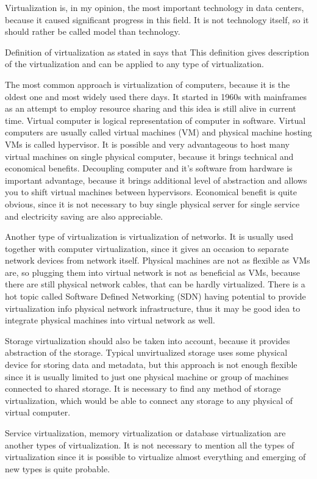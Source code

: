 
Virtualization is, in my opinion, the most important technology in data centers, because it caused significant progress in this field. It is not technology itself, so it should rather be called model than technology.

Definition of virtualization as stated in \cite{virtualization-in-education} says that  This definition gives description of the virtualization and can be applied to any type of virtualization.

The most common approach is virtualization of computers, because it is the oldest one and most widely used there days. It started in 1960s with mainframes as an attempt to employ resource sharing and this idea is still alive in current time. Virtual computer is logical representation of computer in software. \cite{virtualization-in-education} Virtual computers are usually called virtual machines (\Ac{VM}) and physical machine hosting \Ac{VM}s is called hypervisor. It is possible and very advantageous to host many virtual machines on single physical computer, because it brings technical and economical benefits. Decoupling computer and it's software from hardware is important advantage, because it brings additional level of abstraction and allows you to shift virtual machines between hypervisors. Economical benefit is quite obvious, since it is not necessary to buy single physical server for single service and electricity saving are also appreciable.

Another type of virtualization is virtualization of networks. It is usually used together with computer virtualization, since it gives an occasion to separate network devices from network itself. Physical machines are not as flexible as \Ac{VM}s are, so plugging them into virtual network is not as beneficial as \Ac{VM}s, because there are still physical network cables, that can be hardly virtualized. There is a hot topic called Software Defined Networking (\Ac{SDN}) having potential to provide virtualization info physical network infrastructure, thus it may be good idea to integrate physical machines into virtual network as well.

Storage virtualization should also be taken into account, because it provides abstraction of the storage. Typical unvirtualized storage uses some physical device for storing data and metadata, but this approach is not enough flexible since it is usually limited to just one physical machine or group of machines connected to shared storage. It is necessary to find any method of storage virtualization, which would be able to connect any storage to any physical of virtual computer.

Service virtualization, memory virtualization or database virtualization are another types of virtualization. It is not necessary to mention all the types of virtualization since it is possible to virtualize almost everything and emerging of new types is quite probable. 


